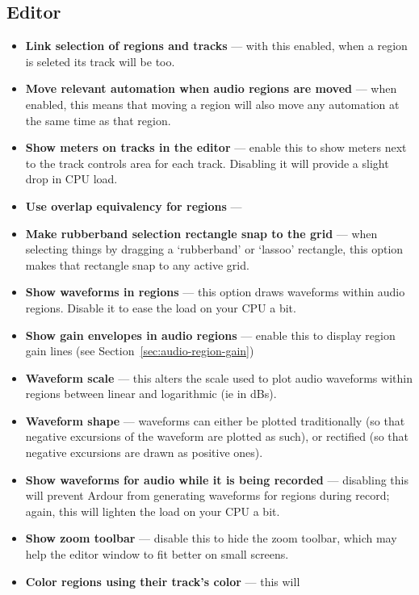 \documentclass[10pt,a4paper]{book}
\newcommand{\todo}[1]{\marginpar{\small\texttt{#1}}}
\begin{document}
\subsection{Editor}
\label{sec:ardour-preferences-editor}

\begin{itemize}
\item \textbf{Link selection of regions and tracks} --- with this
  enabled, when a region is seleted its track will be too.
\item \textbf{Move relevant automation when audio regions are moved}
  --- when enabled, this means that moving a region will also move any
  automation at the same time as that region.
\item \textbf{Show meters on tracks in the editor} --- enable this to
  show meters next to the track controls area for each track.
  Disabling it will provide a slight drop in CPU load.
\item \textbf{Use overlap equivalency for regions} --- \todo{?!}
\item \textbf{Make rubberband selection rectangle snap to the grid}
  --- when selecting things by dragging a `rubberband' or `lassoo'
  rectangle, this option makes that rectangle snap to any active grid.
\item \textbf{Show waveforms in regions} --- this option draws
  waveforms within audio regions.  Disable it to ease the load on your
  CPU a bit.
\item \textbf{Show gain envelopes in audio regions} --- enable this to
  display region gain lines (see Section~\ref{sec:audio-region-gain})
\item \textbf{Waveform scale} --- this alters the scale used to plot
  audio waveforms within regions between linear and logarithmic (ie in
  dBs).
\item \textbf{Waveform shape} --- waveforms can either be plotted
  traditionally (so that negative excursions of the waveform are
  plotted as such), or rectified (so that negative excursions are
  drawn as positive ones).
\item \textbf{Show waveforms for audio while it is being recorded} ---
  disabling this will prevent Ardour from generating waveforms for
  regions during record; again, this will lighten the load on your CPU
  a bit.
\item \textbf{Show zoom toolbar} --- disable this to hide the zoom
  toolbar, which may help the editor window to fit better on small
  screens.
\item \textbf{Color regions using their track's color} --- this will

\end{itemize}
\end{document}
